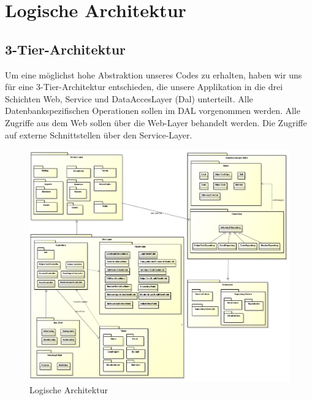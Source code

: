 \chapter{Logische Architektur}
\section{3-Tier-Architektur}
	Um eine möglichst hohe Abstraktion unseres Codes zu erhalten, haben wir uns für eine 3-Tier-Architektur entschieden, die unsere Applikation in die drei Schichten Web, Service und DataAccesLayer (Dal) unterteilt. Alle Datenbankspezifischen Operationen sollen im DAL vorgenommen werden. Alle Zugriffe aus dem Web sollen über die Web-Layer behandelt werden. Die Zugriffe auf externe Schnittstellen über den Service-Layer.
    \begin{figure}[h]
  		\vspace{-5pt}
    	\centering
		\includegraphics[width=\textwidth]{content/architekturdokumentation/images/LogischeArchitektur.png}
  		\vspace{-20pt}
    	\caption{Logische Architektur}
	\end{figure}

\newpage
